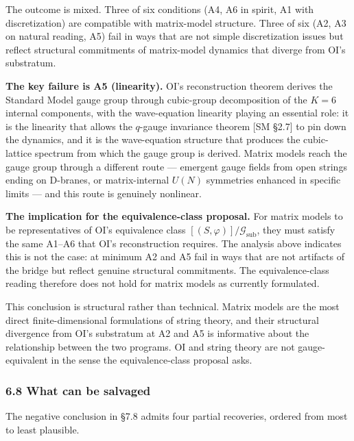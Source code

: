 \documentclass[
]{article}
\begin{document}
The outcome is mixed. Three of six conditions (A4, A6 in spirit, A1 with
discretization) are compatible with matrix-model structure. Three of six
(A2, A3 on natural reading, A5) fail in ways that are not simple
discretization issues but reflect structural commitments of matrix-model
dynamics that diverge from OI's substratum.

\textbf{The key failure is A5 (linearity).} OI's reconstruction theorem
derives the Standard Model gauge group through cubic-group decomposition
of the \(K = 6\) internal components, with the wave-equation linearity
playing an essential role: it is the linearity that allows the
\(q\)-gauge invariance theorem {[}SM §2.7{]} to pin down the dynamics,
and it is the wave-equation structure that produces the cubic-lattice
spectrum from which the gauge group is derived. Matrix models reach the
gauge group through a different route --- emergent gauge fields from
open strings ending on D-branes, or matrix-internal \(U(N)\) symmetries
enhanced in specific limits --- and this route is genuinely nonlinear.

\textbf{The implication for the equivalence-class proposal.} For matrix
models to be representatives of OI's equivalence class
\([(S, \varphi)]/\mathcal{G}_{\text{sub}}\), they must satisfy the same
A1--A6 that OI's reconstruction requires. The analysis above indicates
this is not the case: at minimum A2 and A5 fail in ways that are not
artifacts of the bridge but reflect genuine structural commitments. The
equivalence-class reading therefore does not hold for matrix models as
currently formulated.

This conclusion is structural rather than technical. Matrix models are
the most direct finite-dimensional formulations of string theory, and
their structural divergence from OI's substratum at A2 and A5 is
informative about the relationship between the two programs. OI and
string theory are not gauge-equivalent in the sense the
equivalence-class proposal asks.

\hypertarget{what-can-be-salvaged}{%
\subsubsection{6.8 What can be salvaged}\label{what-can-be-salvaged}}

The negative conclusion in §7.8 admits four partial recoveries, ordered
from most to least plausible.
\end{document}
